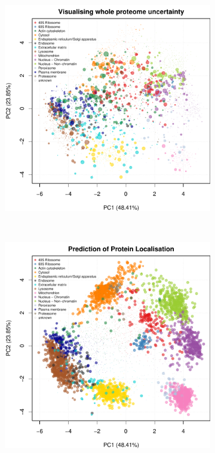 \documentclass[12pt,english]{article}
\begin{document}
\begin{figure}[h]
  \centering
  \begin{subfigure}[t]{0.5\textwidth}
    \centering
\includegraphics{tagm-027}
    \caption{}
  \end{subfigure}%
~
  \begin{subfigure}[t]{0.5\textwidth}
    \centering
\includegraphics{tagm-028}
    \caption{}
  \end{subfigure}%
~


\end{figure}
\end{document}
